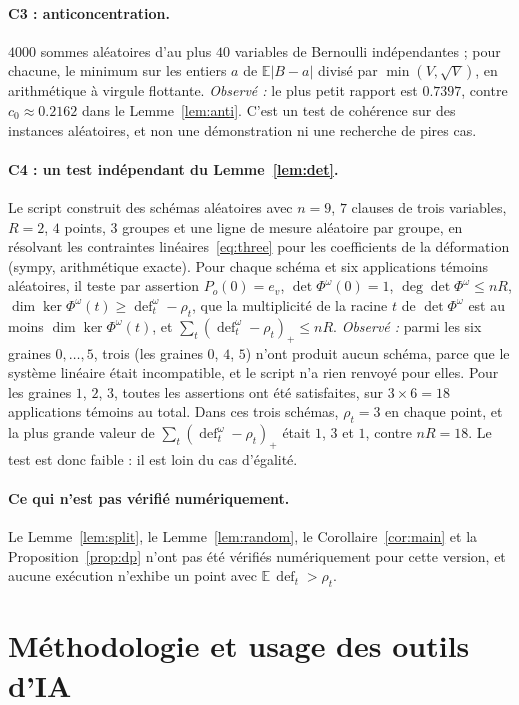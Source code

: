 \documentclass[11pt,a4paper]{article}
\theoremstyle{definition}
\theoremstyle{remark}
\newcommand{\E}{\mathbb{E}}
\newcommand{\dfc}{\operatorname{def}}
\begin{document}
\paragraph{C3 : anticoncentration.} $4000$ sommes aléatoires d'au plus $40$ variables de
Bernoulli indépendantes ; pour chacune, le minimum sur les entiers $a$ de $\E|B-a|$ divisé
par $\min(V,\sqrt V)$, en arithmétique à virgule flottante. \emph{Observé :} le plus petit
rapport est $0.7397$, contre $c_0\approx0.2162$ dans le Lemme~\ref{lem:anti}. C'est un test
de cohérence sur des instances aléatoires, et non une démonstration ni une recherche de
pires cas.

\paragraph{C4 : un test indépendant du Lemme~\ref{lem:det}.} Le script construit des schémas
aléatoires avec $n=9$, $7$ clauses de trois variables, $R=2$, $4$ points, $3$ groupes et une
ligne de mesure aléatoire par groupe, en résolvant les contraintes
linéaires~\eqref{eq:three} pour les coefficients de la déformation (sympy, arithmétique
exacte). Pour chaque schéma et six applications témoins aléatoires, il teste par assertion
$P_o(0)=e_v$, $\det\Phi^\omega(0)=1$, $\deg\det\Phi^\omega\le nR$,
$\dim\ker\Phi^\omega(t)\ge\dfc^\omega_t-\rho_t$, que la multiplicité de la racine $t$ de
$\det\Phi^\omega$ est au moins $\dim\ker\Phi^\omega(t)$, et
$\sum_t(\dfc^\omega_t-\rho_t)_+\le nR$. \emph{Observé :} parmi les six graines $0,\dots,5$,
trois (les graines $0$, $4$, $5$) n'ont produit aucun schéma, parce que le système linéaire
était incompatible, et le script n'a rien renvoyé pour elles. Pour les graines $1$, $2$,
$3$, toutes les assertions ont été satisfaites, sur $3\times6=18$ applications témoins au
total. Dans ces trois schémas, $\rho_t=3$ en chaque point, et la plus grande valeur de
$\sum_t(\dfc^\omega_t-\rho_t)_+$ était $1$, $3$ et $1$, contre $nR=18$. Le test est donc
faible : il est loin du cas d'égalité.

\paragraph{Ce qui n'est pas vérifié numériquement.} Le Lemme~\ref{lem:split}, le
Lemme~\ref{lem:random}, le Corollaire~\ref{cor:main} et la Proposition~\ref{prop:dp} n'ont
pas été vérifiés numériquement pour cette version, et aucune exécution n'exhibe un point
avec $\E\,\dfc_t>\rho_t$.

\section{Méthodologie et usage des outils d'IA}\label{sec:ai}
\end{document}
